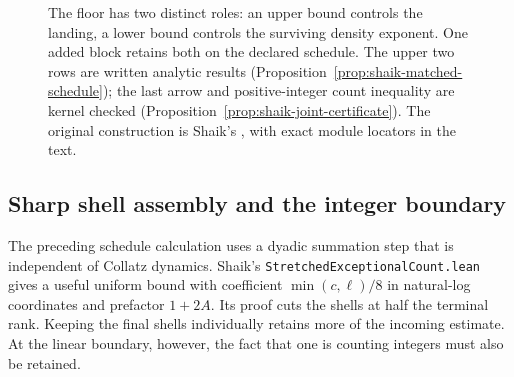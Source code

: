 \documentclass[11pt]{article}
\theoremstyle{remark}\newtheorem{remark}[proposition]{Remark}
\begin{document}
\begin{figure}[ht]
\centering
{}
\caption{The floor has two distinct roles: an upper bound controls the
landing, a lower bound controls the surviving density exponent.
One added block retains both on the declared schedule.
The upper two rows are written analytic results
(Proposition~\ref{prop:shaik-matched-schedule}); the last arrow and
positive-integer count inequality are kernel checked
(Proposition~\ref{prop:shaik-joint-certificate}).
The original construction is Shaik's \cite{Shaik2026v324},
with exact module locators in the text.}
\end{figure}

\subsection{Sharp shell assembly and the integer boundary}

The preceding schedule calculation uses a dyadic summation step that is
independent of Collatz dynamics. Shaik's
\texttt{StretchedExceptionalCount.lean} gives a useful uniform bound
with coefficient \(\min(c,\ell)/8\) in natural-log coordinates and
prefactor \(1+2A\). Its proof cuts the shells at half the terminal
rank. Keeping the final shells individually retains more of the
incoming estimate. At the linear boundary, however, the fact that
one is counting integers must also be retained.
\end{document}
